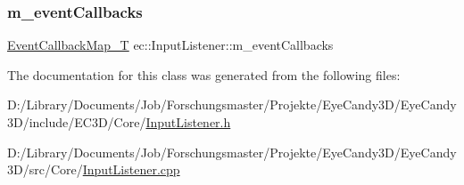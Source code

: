 \mbox{\label{classec_1_1_input_listener_aa1268f07d01b2ef31148ef1dba72951b}} 
\subsubsection{\texorpdfstring{m\+\_\+event\+Callbacks}{m\_eventCallbacks}}
{\footnotesize\ttfamily \mbox{\hyperlink{classec_1_1_input_listener_a13553604a5ae8c32fa95d304206aa01a}{Event\+Callback\+Map\+\_\+T}} ec\+::\+Input\+Listener\+::m\+\_\+event\+Callbacks\hspace{0.3cm}{\ttfamily [protected]}}



The documentation for this class was generated from the following files\+:\begin{DoxyCompactItemize}
\item 
D\+:/\+Library/\+Documents/\+Job/\+Forschungsmaster/\+Projekte/\+Eye\+Candy3\+D/\+Eye\+Candy3\+D/include/\+E\+C3\+D/\+Core/\mbox{\hyperlink{_input_listener_8h}{Input\+Listener.\+h}}\item 
D\+:/\+Library/\+Documents/\+Job/\+Forschungsmaster/\+Projekte/\+Eye\+Candy3\+D/\+Eye\+Candy3\+D/src/\+Core/\mbox{\hyperlink{_input_listener_8cpp}{Input\+Listener.\+cpp}}\end{DoxyCompactItemize}
